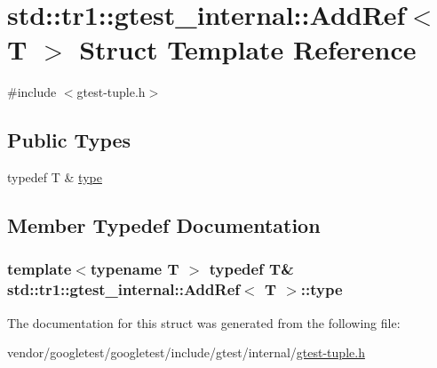 \hypertarget{structstd_1_1tr1_1_1gtest__internal_1_1AddRef}{}\section{std\+:\+:tr1\+:\+:gtest\+\_\+internal\+:\+:Add\+Ref$<$ T $>$ Struct Template Reference}
\label{structstd_1_1tr1_1_1gtest__internal_1_1AddRef}


{\ttfamily \#include $<$gtest-\/tuple.\+h$>$}

\subsection*{Public Types}
\begin{DoxyCompactItemize}
\item 
typedef T \& \hyperlink{structstd_1_1tr1_1_1gtest__internal_1_1AddRef_a1e5616e414125574c1653e3a1fc68491}{type}
\end{DoxyCompactItemize}


\subsection{Member Typedef Documentation}
\subsubsection[{\texorpdfstring{type}{type}}]{\setlength{\rightskip}{0pt plus 5cm}template$<$typename T $>$ typedef T\& {\bf std\+::tr1\+::gtest\+\_\+internal\+::\+Add\+Ref}$<$ T $>$\+::{\bf type}}\hypertarget{structstd_1_1tr1_1_1gtest__internal_1_1AddRef_a1e5616e414125574c1653e3a1fc68491}{}\label{structstd_1_1tr1_1_1gtest__internal_1_1AddRef_a1e5616e414125574c1653e3a1fc68491}


The documentation for this struct was generated from the following file\+:\begin{DoxyCompactItemize}
\item 
vendor/googletest/googletest/include/gtest/internal/\hyperlink{gtest-tuple_8h}{gtest-\/tuple.\+h}\end{DoxyCompactItemize}
